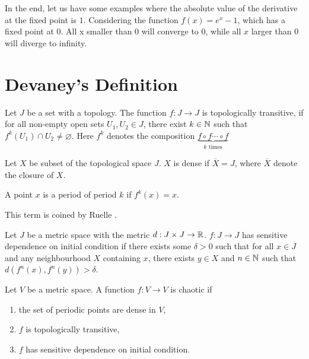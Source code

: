 In the end, let us have some examples where the absolute value of the derivative at the fixed point is $1$.
Considering the function $f(x) = e^x - 1$, which has a fixed point at $0$.
All x smaller than $0$ will converge to $0$, while all $x$ larger than $0$ will diverge to infinity.


\section{Devaney's Definition}

\begin{defn}
	Let $J$ be a set with a topology.
	The function $f: J \rightarrow J$ is topologically transitive, if for all non-empty open sets $U_1, U_2 \in J$, there exist $k \in \mathbb{N}$ such that $f^k(U_1) \cap U_2 \neq \varnothing$. 
	Here $f^k$ denotes the composition $\underbrace{f \circ f \cdots \circ f}_{k \text{ times}}$
\end{defn}

\begin{defn}[Dense]
	Let $X$ be subset of the topological space $J$. 
	$X$ is dense if $\overline{X} = J$, where $\overline{X}$ denote the closure of $X$.
\end{defn}

\begin{defn}
	A point $x$ is a period of period $k$ if $f^k(x)=x$.
\end{defn}

\begin{defn}
	This term is coined by Ruelle \cite{Ruelle-1978}.

	Let $J$ be a metric space with the metric $d: J \times J \rightarrow \mathbb{R}$.
	$f: J \rightarrow J$ has sensitive dependence on initial condition if there exists some $\delta > 0$ such that for all $x \in J$ and any neighbourhood $X$ containing $x$, there exists $y \in X$ and $n \in \mathbb{N}$ such that $d(f^n(x), f^n(y)) > \delta$.
\end{defn}

\begin{defn}\label{def:Devaney_definition_for_chaos}
	Let $V$ be a metric space.
	A function $f: V \rightarrow V$ is chaotic if 
	\begin{enumerate}
		\item the set of periodic points are dense in $V$,
		\item $f$ is topologically transitive,
		\item $f$ has sensitive dependence on initial condition. 
	\end{enumerate}
	
\end{defn}


